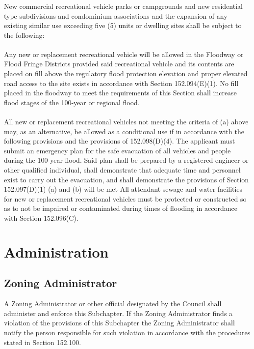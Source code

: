 \subsubsection{}
New commercial recreational vehicle parks or campgrounds and new residential type subdivisions and condominium associations and the expansion of any existing similar use exceeding five (5) units or dwelling sites shall be subject to the following:
\paragraph{}
Any new or replacement recreational vehicle will be allowed in the Floodway or Flood Fringe Districts provided said recreational vehicle and its contents are placed on fill above the regulatory flood protection elevation and proper elevated road access to the site exists in accordance with Section 152.094(E)(1). No fill placed in the floodway to meet the requirements of this Section shall increase flood stages of the 100-year or regional flood.
\paragraph{}
All new or replacement recreational vehicles not meeting the criteria of (a) above may, as an alternative, be allowed as a conditional use if in accordance with the following provisions and the provisions of 152.098(D)(4). The applicant must submit an emergency plan for the safe evacuation of all vehicles and people during the 100 year flood. Said plan shall be prepared by a registered engineer or other qualified individual, shall demonstrate that adequate time and personnel exist to carry out the evacuation, and shall demonstrate the provisions of Section 152.097(D)(1) (a) and (b) will be met All attendant sewage and water facilities for new or replacement recreational vehicles must be protected or constructed so as to not be impaired or contaminated during times of flooding in accordance with Section 152.096(C).

\section{Administration}
\subsection{Zoning Administrator}
A Zoning Administrator or other official designated by the Council shall administer and enforce this Subchapter. If the Zoning Administrator finds a violation of the provisions of this Subchapter the Zoning Administrator shall notify the person responsible for such violation in accordance with the procedures stated in Section 152.100.
